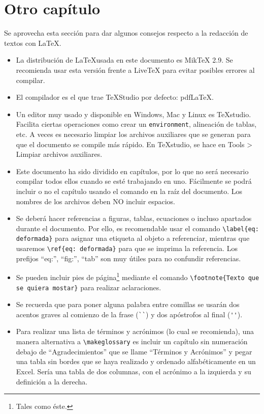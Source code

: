 \chapter{Otro capítulo}
Se aprovecha esta sección para dar algunos consejos respecto a la redacción de textos con \LaTeX.
\begin{itemize}
	\item La distribución de \LaTeX usada en este documento es MikTeX 2.9. Se recomienda usar esta versión frente a LiveTeX para evitar posibles errores al compilar.
	\item El compilador es el que trae TeXStudio por defecto: pdfLaTeX.
	\item Un editor muy usado y disponible en Windows, Mac y Linux es TeXstudio. Facilita ciertas operaciones como crear un \texttt{environment}, alineación de tablas, etc. A veces es necesario limpiar los archivos auxiliares que se generan para que el documento se compile más rápido. En TeXstudio, se hace en Tools >  Limpiar archivos auxiliares.
	\item Este documento ha sido dividido en capítulos, por lo que no será necesario compilar todos ellos cuando se esté trabajando en uno. Fácilmente se podrá incluir o no el capítulo usando el comando \lstinline!! en la raíz del documento. Los nombres de los archivos deben NO incluir espacios.
	\item Se deberá hacer referencias a figuras, tablas, ecuaciones o incluso apartados durante el documento. Por ello, es recomendable usar el comando \lstinline!\label{eq: deformada}! para asignar una etiqueta al objeto a referenciar, mientras que usaremos \lstinline!\ref{eq: deformada}! para que se imprima la referencia. Los prefijos ``eq:'', ``fig:'', ``tab'' son muy útiles para no confundir referencias.
	\item Se pueden incluir pies de página\footnote{Tales como éste.} mediante el comando \lstinline!\footnote{Texto que se quiera mostar}! para realizar aclaraciones.
	\item Se recuerda que para poner alguna palabra entre comillas se usarán dos acentos graves al comienzo de la frase (\lstinline!``!) y dos apóstrofos al final (\lstinline!''!).
	\item Para realizar una lista de términos y acrónimos (lo cual se recomienda), una manera alternativa a \lstinline!\makeglossary! es incluir un capítulo sin numeración debajo de ``Agradecimientos'' que se llame ``Términos y Acrónimos'' y pegar una tabla sin bordes que se haya realizado y ordenado alfabéticamente en un Excel. Sería una tabla de dos columnas, con el acrónimo a la izquierda y su definición a la derecha.
\end{itemize}


